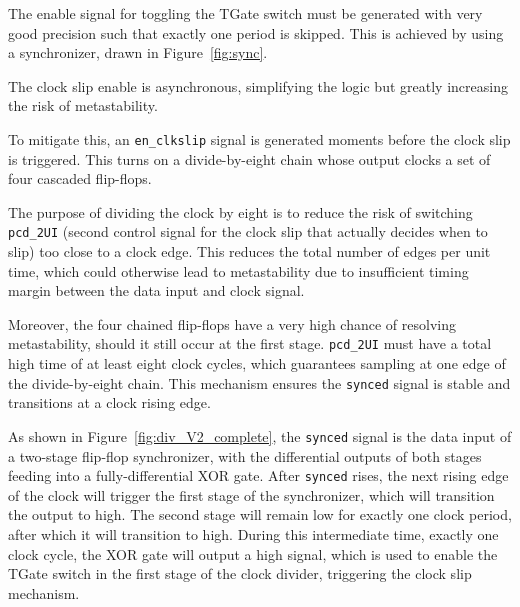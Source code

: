 The enable signal for toggling the TGate switch must be generated with very good precision such that exactly one period is skipped. This is achieved by using a synchronizer, drawn in Figure~\ref{fig:sync}.

The clock slip enable is asynchronous, simplifying the logic but greatly increasing the risk of metastability. 

To mitigate this, an \texttt{en\_clkslip} signal is generated moments before the clock slip is triggered. This turns on a divide-by-eight chain whose output clocks a set of four cascaded flip-flops. 

The purpose of dividing the clock by eight is to reduce the risk of switching \texttt{pcd\_2UI} (second control signal for the clock slip that actually decides when to slip) too close to a clock edge. This reduces the total number of edges per unit time, which could otherwise lead to metastability due to insufficient timing margin between the data input and clock signal. 

Moreover, the four chained flip-flops have a very high chance of resolving metastability, should it still occur at the first stage. \texttt{pcd\_2UI} must have a total high time of at least eight clock cycles, which guarantees sampling at one edge of the divide-by-eight chain.
This mechanism ensures the \texttt{synced} signal is stable and transitions at a clock rising edge.

As shown in Figure~\ref{fig:div_V2_complete}, the \texttt{synced} signal is the data input of a two-stage flip-flop synchronizer, with the differential outputs of both stages feeding into a fully-differential XOR gate.
After \texttt{synced} rises, the next rising edge of the clock will trigger the first stage of the synchronizer, which will transition the output to high. The second stage will remain low for exactly one clock period, after which it will transition to high. During this intermediate time, exactly one clock cycle, the XOR gate will output a high signal, which is used to enable the TGate switch in the first stage of the clock divider, triggering the clock slip mechanism.

